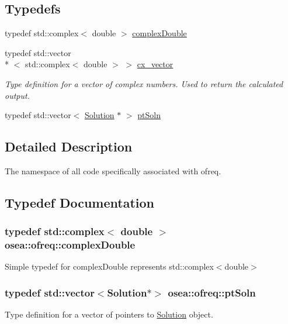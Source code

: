 \subsection*{Typedefs}
\begin{DoxyCompactItemize}
\item 
typedef std\-::complex$<$ double $>$ \hyperlink{namespaceosea_1_1ofreq_a40cad4695a41123a7ae6ab0b6e8b1664}{complex\-Double}
\item 
\hypertarget{namespaceosea_1_1ofreq_a42bf1d8bbba99693142c4184486ad3e0}{typedef std\-::vector\\*
$<$ std\-::complex$<$ double $>$ $>$ \hyperlink{namespaceosea_1_1ofreq_a42bf1d8bbba99693142c4184486ad3e0}{cx\-\_\-vector}}\label{namespaceosea_1_1ofreq_a42bf1d8bbba99693142c4184486ad3e0}

\begin{DoxyCompactList}\small\item\em Type definition for a vector of complex numbers. Used to return the calculated output. \end{DoxyCompactList}\item 
typedef std\-::vector$<$ \hyperlink{classosea_1_1ofreq_1_1_solution}{Solution} $\ast$ $>$ \hyperlink{namespaceosea_1_1ofreq_a951464fca478bccfc9e5295910e5eec3}{pt\-Soln}
\end{DoxyCompactItemize}


\subsection{Detailed Description}
The namespace of all code specifically associated with ofreq. 

\subsection{Typedef Documentation}
\hypertarget{namespaceosea_1_1ofreq_a40cad4695a41123a7ae6ab0b6e8b1664}{
\subsubsection[{complex\-Double}]{\setlength{\rightskip}{0pt plus 5cm}typedef std\-::complex$<$ double $>$ {\bf osea\-::ofreq\-::complex\-Double}}}\label{namespaceosea_1_1ofreq_a40cad4695a41123a7ae6ab0b6e8b1664}
Simple typedef for complex\-Double represents std\-::complex$<$double$>$ \hypertarget{namespaceosea_1_1ofreq_a951464fca478bccfc9e5295910e5eec3}{
\subsubsection[{pt\-Soln}]{\setlength{\rightskip}{0pt plus 5cm}typedef std\-::vector$<${\bf Solution}$\ast$$>$ {\bf osea\-::ofreq\-::pt\-Soln}}}\label{namespaceosea_1_1ofreq_a951464fca478bccfc9e5295910e5eec3}
Type definition for a vector of pointers to \hyperlink{classosea_1_1ofreq_1_1_solution}{Solution} object. 